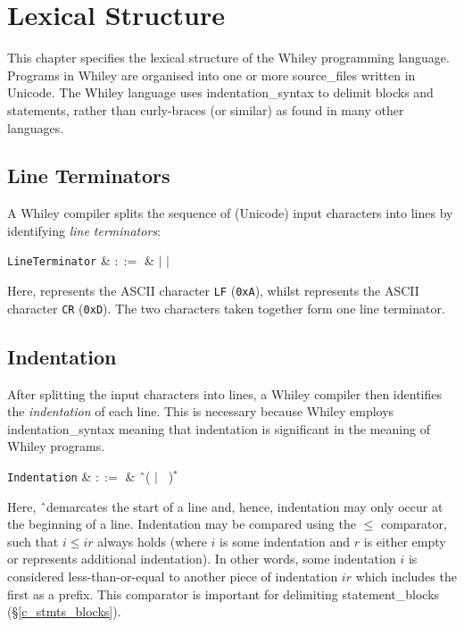 \chapter{Lexical Structure}

This chapter specifies the lexical structure of the Whiley programming language.  Programs in Whiley are organised into one or more \gls{source_file}s written in Unicode.  The Whiley language uses \gls{indentation_syntax} to delimit blocks and statements, rather than curly-braces (or similar) as found in many other languages.  

\section{Line Terminators}
A Whiley compiler splits the sequence of (Unicode) input characters into lines by identifying {\em line terminators}:

\begin{syntax}
\verb+LineTerminator+ & $::=$ &  $|$  $|$ \ \\
\end{syntax}

Here,  represents the ASCII character \verb+LF+ (\verb+0xA+), whilst  represents the ASCII character \verb+CR+ (\verb+0xD+).  The two characters   taken together form one line terminator.

\section{Indentation}
\label{c_lex_indentation}
After splitting the input characters into lines, a Whiley compiler then identifies the {\em indentation} of each line.  This is necessary because Whiley employs \gls{indentation_syntax} meaning that indentation is significant in the meaning of Whiley programs.  

\begin{syntax}
\verb+Indentation+ & $::=$ & \^\ \big(  $|$ \token{ }\ \big)$^*$\\
\end{syntax}

Here, \^\ demarcates the start of a line and, hence, indentation may only occur at the beginning of a line.  Indentation may be compared using the $\le$ comparator, such that $i\le ir$ always holds (where $i$ is some indentation and $r$ is either empty or represents additional indentation).  In other words, some indentation $i$ is considered less-than-or-equal to another piece of indentation $ir$ which includes the first as a prefix.  This comparator is important for delimiting \gls{statement_block}s (\S\ref{c_stmts_blocks}).

